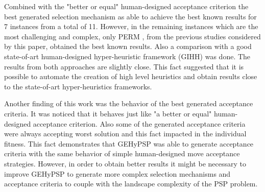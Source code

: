 \documentclass[conference]{IEEEtran}
\begin{document}
Combined with the "better or equal" human-designed acceptance criterion the best generated selection mechanism as able to achieve the best known results for 7 instances from a total of 11. However, in the remaining instances which are the most challenging and complex, only PERM \cite{hsu2003growth}, from the previous studies considered by this paper,  obtained the best known results. Also a comparison with a good state-of-art human-designed hyper-heuristic framework (GIHH) \cite{misir2012intelligent} was done. The results from both approaches are slightly close. This fact suggested that it is possible to automate the creation of high level heuristics and obtain results close to the state-of-art hyper-heuristics frameworks. 

 Another finding of this work was the behavior of the best generated acceptance criteria. It was noticed that it behaves just like "a better or equal" human-designed acceptance criterion. Also some of the generated acceptance criteria were always accepting worst solution and this fact impacted in the individual fitness. This fact demonstrates that GEHyPSP was able to generate acceptance criteria with the same behavior of simple human-designed move acceptance strategies. However, in order to obtain better results it might be necessary to improve GEHyPSP to generate more complex selection mechanisms and acceptance criteria to couple with the landscape complexity of the PSP problem. 
 
 

 
  











%
%
%
	
	



\end{document}
